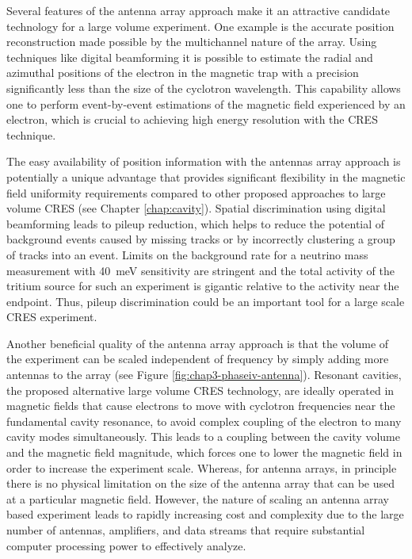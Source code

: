 Several features of the antenna array approach make it an attractive candidate technology for a large volume experiment. One example is the accurate position reconstruction made possible by the multichannel nature of the array. Using techniques like digital beamforming it is possible to estimate the radial and azimuthal positions of the electron in the magnetic trap with a precision significantly less than the size of the cyclotron wavelength. This capability allows one to perform event-by-event estimations of the magnetic field experienced by an electron, which is crucial to achieving high energy resolution with the CRES technique.

The easy availability of position information with the antennas array approach is potentially a unique advantage that provides significant flexibility in the magnetic field uniformity requirements compared to other proposed approaches to large volume CRES (see Chapter \ref{chap:cavity}). Spatial discrimination using digital beamforming leads to pileup reduction, which helps to reduce the potential of background events caused by missing tracks or by incorrectly clustering a group of tracks into an event. Limits on the background rate for a neutrino mass measurement with 40~meV sensitivity are stringent and the total activity of the tritium source for such an experiment is gigantic relative to the activity near the endpoint. Thus, pileup discrimination could be an important tool for a large scale CRES experiment.

Another beneficial quality of the antenna array approach is that the volume of the experiment can be scaled independent of frequency by simply adding more antennas to the array (see Figure \ref{fig:chap3-phaseiv-antenna}). Resonant cavities, the proposed alternative large volume CRES technology, are ideally operated in magnetic fields that cause electrons to move with cyclotron frequencies near the fundamental cavity resonance, to avoid complex coupling of the electron to many cavity modes simultaneously. This leads to a coupling between the cavity volume and the magnetic field magnitude, which forces one to lower the magnetic field in order to increase the experiment scale. Whereas, for antenna arrays, in principle there is no physical limitation on the size of the antenna array that can be used at a particular magnetic field. However, the nature of scaling an antenna array based experiment leads to rapidly increasing cost and complexity due to the large number of antennas, amplifiers, and data streams that require substantial computer processing power to effectively analyze.

